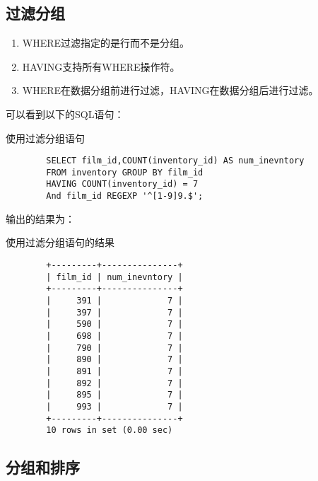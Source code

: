 \documentclass[UTF8]{article}
\begin{document}
\subsection{过滤分组}

\begin{orangebox}[frametitle={Tips 13.2.1 HAVING注意事项}]
        \begin{enumerate}
                \item WHERE过滤指定的是行而不是分组。
                \item HAVING支持所有WHERE操作符。
                \item WHERE在数据分组前进行过滤，HAVING在数据分组后进行过滤。
        \end{enumerate}    
\end{orangebox}

可以看到以下的SQL语句：

\begin{listing}[H]
	\caption{使用过滤分组语句}
	\label{code:usehavingclause}
\begin{verbatim}
        SELECT film_id,COUNT(inventory_id) AS num_inevntory 
        FROM inventory GROUP BY film_id 
        HAVING COUNT(inventory_id) = 7 
        And film_id REGEXP '^[1-9]9.$';
\end{verbatim}
\end{listing}

输出的结果为：

\begin{listing}[H]
	\caption{使用过滤分组语句的结果}
	\label{code:usehavingclauseresult}
\begin{verbatim}
        +---------+---------------+
        | film_id | num_inevntory |
        +---------+---------------+
        |     391 |             7 |
        |     397 |             7 |
        |     590 |             7 |
        |     698 |             7 |
        |     790 |             7 |
        |     890 |             7 |
        |     891 |             7 |
        |     892 |             7 |
        |     895 |             7 |
        |     993 |             7 |
        +---------+---------------+
        10 rows in set (0.00 sec)
\end{verbatim}
\end{listing}

\subsection{分组和排序}
\end{document}
